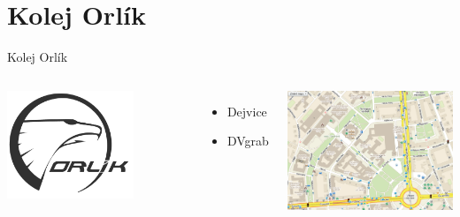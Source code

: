 \documentclass{beamer}
\begin{document}
\section{Kolej Orlík}
\begin{frame}{Kolej Orlík}
	\begin{columns}[c]
			\begin{center}
				\includegraphics[width=0.7\textwidth]{logo_ok.png}
			\end{center}

			\begin{itemize}
				\item Dejvice
				\item DVgrab
			\end{itemize}
			\begin{center}
				\includegraphics[width=\textwidth]{mapa_all.png}
			\end{center}
	\end{columns}

\end{frame}
\end{document}
